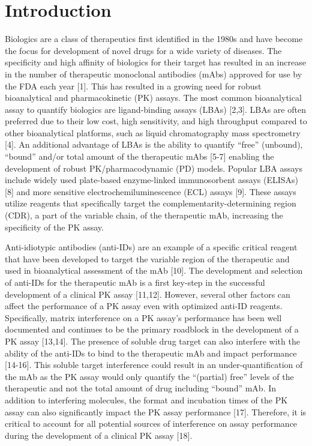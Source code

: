 \section{Introduction}
Biologics are a class of therapeutics first identified in the 1980s and have become the focus for development of novel drugs for a wide variety of diseases.  The specificity and high affinity of biologics for their target has resulted in an increase in the number of therapeutic monoclonal antibodies (mAbs) approved for use by the FDA each year [1].  This has resulted in a growing need for robust bioanalytical and pharmacokinetic (PK) assays.  The most common bioanalytical assay to quantify biologics are ligand-binding assays (LBAs) [2,3].  LBAs are often preferred due to their low cost, high sensitivity, and high throughput compared to other bioanalytical platforms, such as liquid chromatography mass spectrometry [4].  An additional advantage of LBAs is the ability to quantify “free” (unbound), “bound” and/or total amount of the therapeutic mAbs [5-7] enabling the development of robust PK/pharmacodynamic (PD) models.   Popular LBA assays include widely used plate-based enzyme-linked immunosorbent assays (ELISAs) [8] and more sensitive electrochemiluminescence (ECL) assays [9]. These assays utilize reagents that specifically target the complementarity-determining region (CDR), a part of the variable chain, of the therapeutic mAb, increasing the specificity of the PK assay.  

Anti-idiotypic antibodies (anti-IDs) are an example of a specific critical reagent that have been developed to target the variable region of the therapeutic and used in bioanalytical assessment of the mAb [10].  The development and selection of anti-IDs for the therapeutic mAb is a first key-step in the successful development of a clinical PK assay [11,12].  However, several other factors can affect the performance of a PK assay even with optimized anti-ID reagents.  Specifically, matrix interference on a PK assay’s performance has been well documented and continues to be the primary roadblock in the development of a PK assay [13,14].  The presence of soluble drug target can also interfere with the ability of the anti-IDs to bind to the therapeutic mAb and impact performance [14-16].  This soluble target interference could result in an under-quantification of the mAb as the PK assay would only quantify the “(partial) free” levels of the therapeutic and not the total amount of drug including “bound” mAb.  In addition to interfering molecules, the format and incubation times of the PK assay can also significantly impact the PK assay performance [17].  Therefore, it is critical to account for all potential sources of interference on assay performance during the development of a clinical PK assay [18]. 

